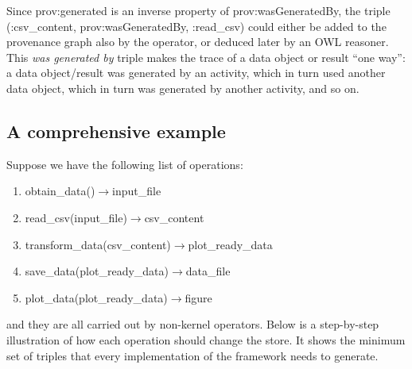 Since prov:generated is an inverse property of prov:wasGeneratedBy, the triple (:csv\_content, prov:wasGeneratedBy, :read\_csv) could either be added to the provenance graph also by the operator, or deduced later by an OWL reasoner. This \emph{was generated by} triple makes the trace of a data object or result ``one way'': a data object/result was generated by an activity, which in turn used another data object, which in turn was generated by another activity, and so on.

\subsection{A comprehensive example}
\label{sec:example}
Suppose we have the following list of operations:
\begin{enumerate}
	\item obtain\_data()$\rightarrow$input\_file
	\item read\_csv(input\_file)$\rightarrow$csv\_content
	\item transform\_data(csv\_content)$\rightarrow$plot\_ready\_data
	\item save\_data(plot\_ready\_data)$\rightarrow$data\_file
	\item plot\_data(plot\_ready\_data)$\rightarrow$figure
\end{enumerate}
and they are all carried out by non-kernel operators. Below is a step-by-step illustration of how each operation should change the store. It shows the minimum set of triples that every implementation of the framework needs to generate.

